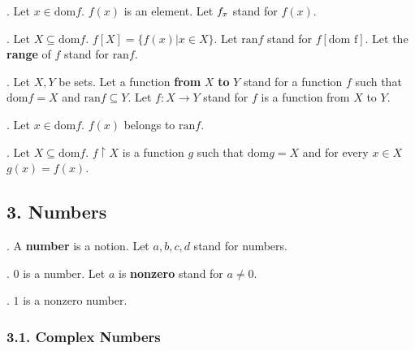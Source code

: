 \begin{signature}.
Let $x \in \text{dom} f$. $f(x)$ is an element. Let
${f}_{x}$ stand for $f(x)$.
\end{signature}


\begin{definition}.
Let $X \subseteq \text{dom} f$. 
$f[X] = \{f(x) | x \in X \}$.
Let $\text{ran} f$ stand for $f[\text{dom f}]$.
Let the {\bf range} of $f$ stand for $\text{ran} f$.
\end{definition}
 
\begin{definition}.
Let $X,Y$ be sets.
Let a function {\bf from} $X$ {\bf to} $Y$ stand for
a function $f$ such that $\text{dom} f = X$ and
$\text{ran} f \subseteq Y$.
Let $f : X \rightarrow Y$ stand for $f$ is a function
from $X$ to $Y$.
\end{definition}

\begin{lemma}.
Let $x \in \text{dom} f$. $f(x)$ belongs to $\text{ran} f$.
\end{lemma}

\begin{definition}.
Let $X \subseteq \text{dom} f$.
$f \upharpoonright X$ is a function
$g$ such that $\text{dom} g = X$ and for every
$x \in X$ $g(x) = f(x)$.
\end{definition}

\subsection{3. Numbers}


\begin{signature}.
A {\bf number} is a notion. Let $a,b,c,d$ stand for numbers.
\end{signature}

\begin{signature}.
$0$ is a number. Let $a$ is {\bf nonzero} stand for $a \neq 0$.
\end{signature}

\begin{signature}.
$1$ is a nonzero number.
\end{signature}

\subsubsection{3.1. Complex Numbers}

